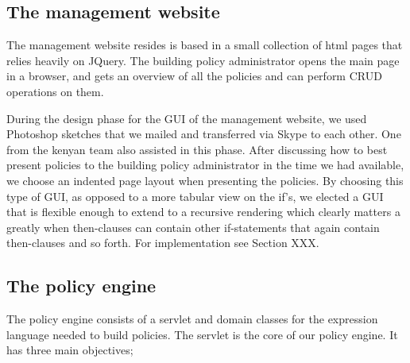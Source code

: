 \subsection{The management website}
The management website resides is based in a small collection of html pages that relies heavily on JQuery. The building policy administrator opens the main page in a browser, and gets an overview of all the policies and can perform CRUD operations on them.

During the design phase for the GUI of the management website, we used Photoshop sketches that we mailed and transferred via Skype to each other. One from the kenyan team also assisted in this phase. After discussing how to best present policies to the building policy administrator in the time we had available, we choose an indented page layout when presenting the policies. By choosing this type of GUI, as opposed to a more tabular view on the if's, we elected a GUI that is flexible enough to extend to a recursive rendering which clearly matters a greatly when then-clauses can contain other if-statements that again contain then-clauses and so forth. For implementation see Section XXX.


\subsection{The policy engine}
The policy engine consists of a servlet and domain classes for the expression language needed to build policies. The servlet is the core of our policy engine. It has three main objectives;

\begin{figure}[b]
\end{figure}

